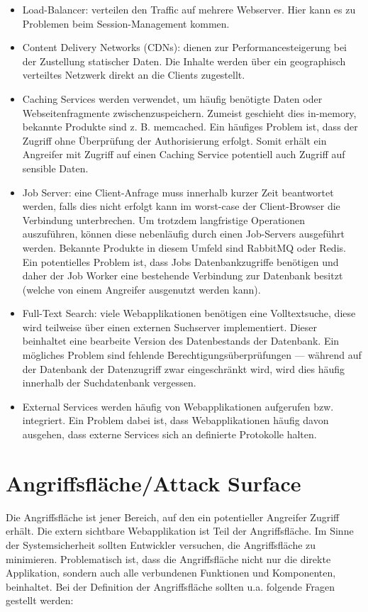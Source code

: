 \begin{itemize}
	\item Load-Balancer: verteilen den Traffic auf mehrere Webserver. Hier kann es zu Problemen beim Session-Management kommen.
	\item Content Delivery Networks (CDNs): dienen zur Performancesteigerung bei der Zustellung statischer Daten. Die Inhalte werden über ein geographisch verteiltes Netzwerk direkt an die Clients zugestellt.
	\item Caching Services werden verwendet, um häufig benötigte Daten oder Webseitenfragmente zwischenzuspeichern. Zumeist geschieht dies in-memory, bekannte Produkte sind z. B. memcached. Ein häufiges Problem ist, dass der Zugriff ohne Überprüfung der Authorisierung erfolgt. Somit erhält ein Angreifer mit Zugriff auf einen Caching Service potentiell auch Zugriff auf sensible Daten.
	\item Job Server: eine Client-Anfrage muss innerhalb kurzer Zeit beantwortet werden, falls dies nicht erfolgt kann im worst-case der Client-Browser die Verbindung unterbrechen. Um trotzdem langfristige Operationen auszuführen, können diese nebenläufig durch einen Job-Servers ausgeführt werden. Bekannte Produkte in diesem Umfeld sind RabbitMQ oder Redis. Ein potentielles Problem ist, dass Jobs Datenbankzugriffe benötigen und daher der Job Worker eine bestehende Verbindung zur Datenbank besitzt (welche von einem Angreifer ausgenutzt werden kann).
	\item Full-Text Search: viele Webapplikationen benötigen eine Volltextsuche, diese wird teilweise über einen externen Suchserver implementiert. Dieser beinhaltet eine bearbeite Version des Datenbestands der Datenbank. Ein mögliches Problem sind fehlende Berechtigungsüberprüfungen --- während auf der Datenbank der Datenzugriff zwar eingeschränkt wird, wird dies häufig innerhalb der Suchdatenbank vergessen.
	\item External Services werden häufig von Webapplikationen aufgerufen bzw. integriert. Ein Problem dabei ist, dass Webapplikationen häufig davon ausgehen, dass externe Services sich an definierte Protokolle halten.
\end{itemize}

\section{Angriffsfläche/Attack Surface}

Die Angriffsfläche ist jener Bereich, auf den ein potentieller Angreifer Zugriff erhält. Die extern sichtbare Webapplikation ist Teil der Angriffsfläche. Im Sinne der Systemsicherheit sollten Entwickler versuchen, die Angriffsfläche zu minimieren. Problematisch ist, dass die Angriffsfläche nicht nur die direkte Applikation, sondern auch alle verbundenen Funktionen und Komponenten, beinhaltet. Bei der Definition der Angriffsfläche sollten u.a. folgende Fragen gestellt werden: 

